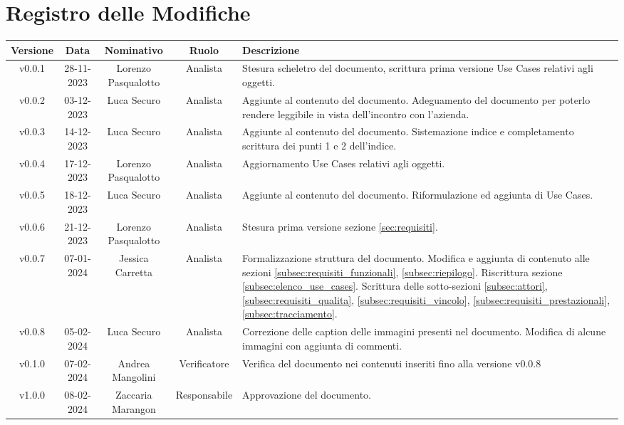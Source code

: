 \section*{\Large Registro delle Modifiche}
    \begin{table}[h]
        \centering
        \renewcommand\tabularxcolumn[1]{m{#1}} %
        \renewcommand{\arraystretch}{1.5}
        \begin{tabularx}{0.98\textwidth}
            {c|c|c|c|>{\centering\arraybackslash}X}
            \rowcolor{black}
            \textbf{\color{white} Versione} & \textbf{\color{white} Data} & \textbf{\color{white} Nominativo} & \textbf{\color{white} Ruolo} & \textbf{\color{white} Descrizione} \\ 
            \hline

            v0.0.1 & 28-11-2023 & Lorenzo Pasqualotto & Analista & Stesura scheletro del documento, scrittura prima versione Use Cases relativi agli oggetti. \\
            v0.0.2 & 03-12-2023 & Luca Securo & Analista & Aggiunte al contenuto del documento. Adeguamento del documento per poterlo rendere leggibile in vista dell'incontro con l'azienda. \\
            v0.0.3 & 14-12-2023 & Luca Securo & Analista & Aggiunte al contenuto del documento. Sistemazione indice e completamento scrittura dei punti 1 e 2 dell'indice.\\
            v0.0.4 & 17-12-2023 & Lorenzo Pasqualotto & Analista &  Aggiornamento Use Cases relativi agli oggetti.\\
            v0.0.5 & 18-12-2023 & Luca Securo & Analista & Aggiunte al contenuto del documento. Riformulazione ed aggiunta di Use Cases.\\
            v0.0.6 & 21-12-2023 & Lorenzo Pasqualotto & Analista & Stesura prima versione sezione \ref{sec:requisiti}.\\
            v0.0.7 & 07-01-2024 & Jessica Carretta & Analista & Formalizzazione struttura del documento. Modifica e aggiunta di contenuto alle sezioni \ref{subsec:requisiti_funzionali}, \ref{subsec:riepilogo}. Riscrittura sezione \ref{subsec:elenco_use_cases}. Scrittura delle sotto-sezioni \ref{subsec:attori}, \ref{subsec:requisiti_qualita}, \ref{subsec:requisiti_vincolo}, \ref{subsec:requisiti_prestazionali},\ref{subsec:tracciamento}.\\
            v0.0.8 & 05-02-2024 & Luca Securo & Analista & Correzione delle caption delle immagini presenti nel documento. Modifica di alcune immagini con aggiunta di commenti.\\
            v0.1.0 & 07-02-2024 & Andrea Mangolini & Verificatore & Verifica del documento nei contenuti inseriti fino alla versione v0.0.8\\
            v1.0.0 & 08-02-2024 & Zaccaria Marangon & Responsabile & Approvazione del documento.\\
            \hline
        \end{tabularx}
    \end{table}